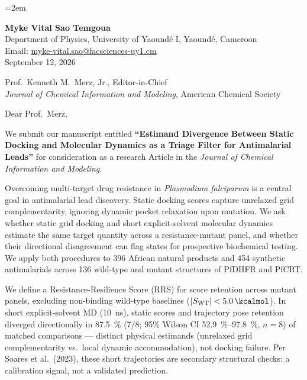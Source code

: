 \documentclass[11pt,letterpaper]{article}
\begin{document}
\emergencystretch=2em

\begin{flushleft}
\textbf{Myke Vital Sao Temgoua} \\
Department of Physics, University of Yaound\'{e} I, Yaound\'{e}, Cameroon \\
Email: \href{mailto:myke-vital.sao@facsciences-uy1.cm}{myke-vital.sao@facsciences-uy1.cm} \\[0.2em]
September 12, 2026
\end{flushleft}

\begin{flushleft}
Prof.\ Kenneth M.\ Merz, Jr., Editor-in-Chief \\
\textit{Journal of Chemical Information and Modeling}, American Chemical Society
\end{flushleft}

\vspace{0.2em}

\noindent Dear Prof.\ Merz,

We submit our manuscript entitled \textbf{``Estimand Divergence Between Static Docking and Molecular Dynamics as a Triage Filter for Antimalarial Leads''} for consideration as a research Article in the \textit{Journal of Chemical Information and Modeling}.

Overcoming multi-target drug resistance in \textit{Plasmodium falciparum} is a central goal in antimalarial lead discovery. Static docking scores capture unrelaxed grid complementarity, ignoring dynamic pocket relaxation upon mutation. We ask whether static grid docking and short explicit-solvent molecular dynamics estimate the same target quantity across a resistance-mutant panel, and whether their directional disagreement can flag states for prospective biochemical testing. We apply both procedures to 396 African natural products and 454 synthetic antimalarials across 136 wild-type and mutant structures of PfDHFR and PfCRT.

We define a Resistance-Resilience Score (RRS) for score retention across mutant panels, excluding non-binding wild-type baselines ($|S_{\mathrm{WT}}| < \qty{5.0}{\kcalmol}$). In short explicit-solvent MD (\qty{10}{\ns}), static scores and trajectory pose retention diverged directionally in \qty{87.5}{\percent} (7/8; 95\% Wilson CI \qtyrange{52.9}{97.8}{\percent}, $n=\num{8}$) of matched comparisons --- distinct physical estimands (unrelaxed grid complementarity vs.\ local dynamic accommodation), not docking failure. Per Soares et al.\ (2023), these short trajectories are secondary structural checks: a calibration signal, not a validated prediction.
\end{document}

